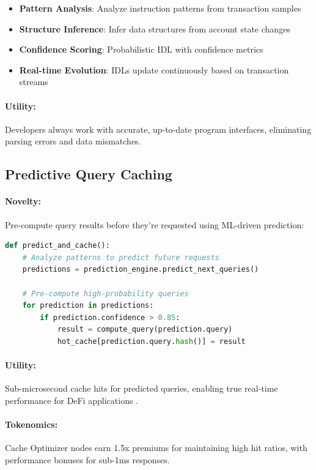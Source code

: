 \documentclass[12pt,a4paper]{article}
\begin{document}
\begin{itemize}
    \item \textbf{Pattern Analysis}: Analyze instruction patterns from transaction samples
    \item \textbf{Structure Inference}: Infer data structures from account state changes
    \item \textbf{Confidence Scoring}: Probabilistic IDL with confidence metrics
    \item \textbf{Real-time Evolution}: IDLs update continuously based on transaction streams
\end{itemize}

\paragraph{Utility:} Developers always work with accurate, up-to-date program interfaces, eliminating parsing errors and data mismatches.

\subsection{Predictive Query Caching}

\paragraph{Novelty:} Pre-compute query results before they're requested using ML-driven prediction:

\begin{lstlisting}[language=Python, caption=Predictive Caching System]
def predict_and_cache():
    # Analyze patterns to predict future requests
    predictions = prediction_engine.predict_next_queries()

    # Pre-compute high-probability queries
    for prediction in predictions:
        if prediction.confidence > 0.85:
            result = compute_query(prediction.query)
            hot_cache[prediction.query.hash()] = result
\end{lstlisting}

\paragraph{Utility:} Sub-microsecond cache hits for predicted queries, enabling true real-time performance for DeFi applications \cite{caching2020, latency2021}.

\paragraph{Tokenomics:} Cache Optimizer nodes earn 1.5x premiums for maintaining high hit ratios, with performance bonuses for sub-1ms responses.
\end{document}
